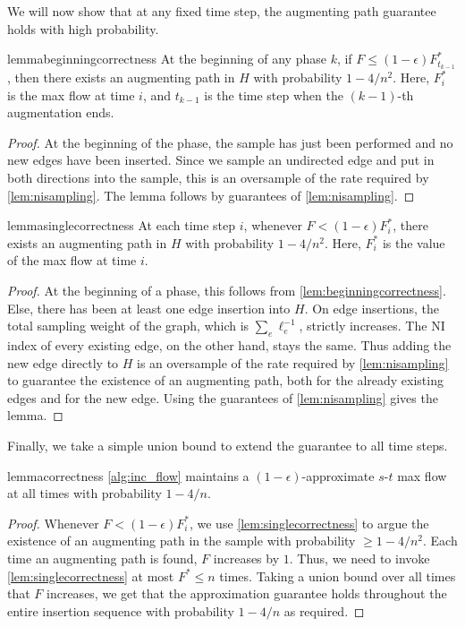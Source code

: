 \documentclass[11pt,a4paper]{article}
\newcommand{\eps}{\epsilon}
\begin{document}
We will now show that at any fixed time step, the augmenting path guarantee holds with high probability.

\begin{restatable}{lemma}{beginningcorrectness}
\label{lem:beginningcorrectness}
At the beginning of any phase $k$, if $F \le (1-\eps)F^*_{t_{k-1}}$, then there exists an augmenting path in $H$ with probability $1 - 4/n^2$. Here, $F^*_i$ is the max flow at time $i$, and $t_{k-1}$ is the time step when the $(k-1)$-th augmentation ends.
\end{restatable}
\begin{proof}
At the beginning of the phase, the sample has just been performed and no new edges have been inserted. Since we sample an undirected edge and put in both directions into the sample, this is an oversample
of the rate required by \cref{lem:nisampling}. The lemma follows by guarantees of \cref{lem:nisampling}.
\end{proof}

\begin{restatable}{lemma}{singlecorrectness}
\label{lem:singlecorrectness}
At each time step $i$, whenever $F < (1-\eps) F^*_i$, there exists an augmenting path in $H$ with probability $1 - 4/n^2$. Here, $F^*_i$ is the value of the max flow at time $i$.
\end{restatable}
\begin{proof}
At the beginning of a phase, this follows from \cref{lem:beginningcorrectness}. Else, there has been at least one edge insertion into $H$. On edge insertions, the total sampling weight of the graph, which is $\sum_e \ell_e^{-1}$, strictly increases. The NI index of every existing edge, on the other hand, stays the same. Thus adding the new edge directly to $H$ is an oversample
of the rate required by \cref{lem:nisampling} to guarantee the existence of an augmenting path, both for the already existing edges and for the new edge. Using the guarantees of \cref{lem:nisampling} gives the lemma.
\end{proof}

Finally, we take a simple union bound to extend the guarantee to all time steps.

\begin{restatable}{lemma}{correctness}
\label{lem:correctness}
\cref{alg:inc_flow} maintains a $(1-\eps)$-approximate $s$-$t$ max flow at all times with probability $1 - 4/n$.
\end{restatable}
\begin{proof}
Whenever $F < (1-\eps) F_i^*$, we use \cref{lem:singlecorrectness} to argue the existence of an augmenting path in the sample with probability $\ge 1 - 4/n^2$. Each time an augmenting path is found, $F$ increases by $1$. Thus, we need to invoke \cref{lem:singlecorrectness} at most $F^* \le n$ times. Taking a union bound over all times that $F$ increases, we get that the approximation guarantee holds throughout the entire insertion sequence with probability $1 - 4/n$ as required.
\end{proof}
\end{document}
